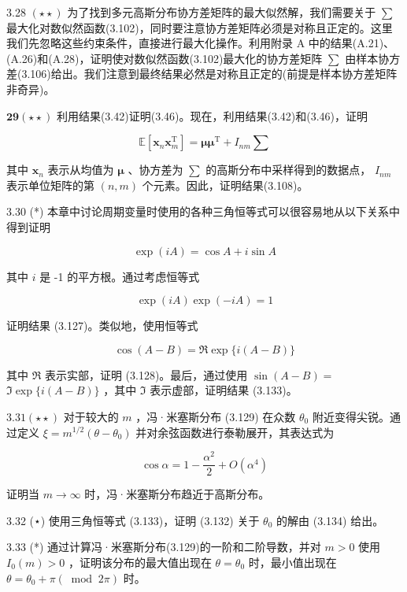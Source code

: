 \documentclass[10pt]{article}
\begin{document}
3.28 \(\left( {\star  \star  }\right)\) 为了找到多元高斯分布协方差矩阵的最大似然解，我们需要关于 \(\mathbf{\sum }\) 最大化对数似然函数(3.102)，同时要注意协方差矩阵必须是对称且正定的。这里我们先忽略这些约束条件，直接进行最大化操作。利用附录 A 中的结果(A.21)、(A.26)和(A.28)，证明使对数似然函数(3.102)最大化的协方差矩阵 \(\mathbf{\sum }\) 由样本协方差(3.106)给出。我们注意到最终结果必然是对称且正定的(前提是样本协方差矩阵非奇异)。

\(\mathbf{{29}}\left( {\star  \star  }\right)\) 利用结果(3.42)证明(3.46)。现在，利用结果(3.42)和(3.46)，证明

\[
\mathbb{E}\left\lbrack  {{\mathbf{x}}_{n}{\mathbf{x}}_{m}^{\mathrm{T}}}\right\rbrack   = \mathbf{\mu }{\mathbf{\mu }}^{\mathrm{T}} + {I}_{nm}\mathbf{\sum } \tag{3.213}
\]

其中 \({\mathbf{x}}_{n}\) 表示从均值为 \(\mathbf{\mu }\) 、协方差为 \(\mathbf{\sum }\) 的高斯分布中采样得到的数据点， \({I}_{nm}\) 表示单位矩阵的第 \(\left( {n,m}\right)\) 个元素。因此，证明结果(3.108)。

3.30 (*) 本章中讨论周期变量时使用的各种三角恒等式可以很容易地从以下关系中得到证明

\[
\exp \left( {iA}\right)  = \cos A + i\sin A \tag{3.214}
\]

其中 \(i\) 是 -1 的平方根。通过考虑恒等式

\[
\exp \left( {iA}\right) \exp \left( {-{iA}}\right)  = 1 \tag{3.215}
\]

证明结果 (3.127)。类似地，使用恒等式

\[
\cos \left( {A - B}\right)  = \Re \exp \{ i\left( {A - B}\right) \}  \tag{3.216}
\]

其中 \(\Re\) 表示实部，证明 (3.128)。最后，通过使用 \(\sin \left( {A - B}\right)  =\)  \(\Im \exp \{ i\left( {A - B}\right) \}\) ，其中 \(\Im\) 表示虚部，证明结果 (3.133)。

\({3.31}\left( {\star  \star  }\right)\) 对于较大的 \(m\) ，冯·米塞斯分布 (3.129) 在众数 \({\theta }_{0}\) 附近变得尖锐。通过定义 \(\xi  = {m}^{1/2}\left( {\theta  - {\theta }_{0}}\right)\) 并对余弦函数进行泰勒展开，其表达式为

\[
\cos \alpha  = 1 - \frac{{\alpha }^{2}}{2} + O\left( {\alpha }^{4}\right)  \tag{3.217}
\]

证明当 \(m \rightarrow  \infty\) 时，冯·米塞斯分布趋近于高斯分布。

3.32 (⋆) 使用三角恒等式 (3.133)，证明 (3.132) 关于 \({\theta }_{0}\) 的解由 (3.134) 给出。

3.33 (*) 通过计算冯·米塞斯分布(3.129)的一阶和二阶导数，并对 \(m > 0\) 使用 \({I}_{0}\left( m\right)  > 0\) ，证明该分布的最大值出现在 \(\theta  = {\theta }_{0}\) 时，最小值出现在 \(\theta  = {\theta }_{0} + \pi \left( {{\;\operatorname{mod}\;2}\pi }\right)\) 时。
\end{document}
